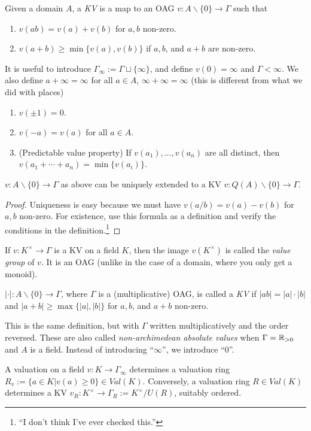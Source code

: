  \begin{definition}
   Given a domain $A$, a \emph{KV} is a map to an OAG $v:A\smallsetminus \{0\}\to \Gamma$
   such that
   \begin{enumerate}
     \item $v(ab)=v(a)+v(b)$ for $a,b$ non-zero.
     \item $v(a+b)\ge \min\{v(a), v(b)\}$ if $a,b$, and $a+b$ are non-zero.
   \end{enumerate}
 \end{definition}
 It is useful to introduce $\Gamma_\infty := \Gamma \sqcup \{\infty\}$, and define
 $v(0)=\infty$ and $\Gamma< \infty$. We also define $a+\infty = \infty$ for all $a\in A$,
 $\infty+\infty=\infty$ (this is different from what we did with places)

 \begin{proposition}
   \begin{enumerate}
     \item $v(\pm 1)=0$.
     \item $v(-a)=v(a)$ for all $a\in A$.
     \item (Predictable value property) If $v(a_1), \dots, v(a_n)$ are all distinct, then
     $v(a_1+\cdots +a_n)=\min \{v(a_i)\}$.
   \end{enumerate}
 \end{proposition}
 \begin{proposition}
   $v:A\smallsetminus \{0\} \to \Gamma$ as above can be uniquely extended to a KV
   $v:Q(A)\smallsetminus \{0\} \to \Gamma$.
 \end{proposition}
 \begin{proof}
   Uniqueness is easy because we must have $v(a/b)=v(a)-v(b)$ for $a,b$ non-zero. For
   existence, use this formula as a definition and verify the conditions in the
   definition.\footnote{``I don't think I've ever checked this.''}
 \end{proof}
 \begin{definition}
   If $v:K^\times \to \Gamma$ is a KV on a field $K$, then the image $v(K^\times)$ is called
   the \emph{value group} of $v$. It is an OAG (unlike in the case of a domain, where you
   only get a monoid).
 \end{definition}
 \begin{definition}
   $|\cdot|:A\smallsetminus \{0\}\to \Gamma$, where $\Gamma$ is a (multiplicative) OAG,
   is called a \emph{KV} if $|ab|=|a|\cdot |b|$ and $|a+b|\ge \max \{|a|,|b|\}$ for
   $a,b$, and $a+b$ non-zero.
 \end{definition}
 This is the same definition, but with $\Gamma$ written multiplicatively and the order
 reversed. These are also called \emph{non-archimedean absolute values} when $\Gamma =
 \mathbb{R}_{> 0}$ and $A$ is a field. Instead of introducing ``$\infty$'', we introduce
 ``$0$''.

 \begin{theorem}
   A valuation on a field $v:K\to \Gamma_\infty$ determines a valuation ring $R_v:=
   \{a\in K|v(a)\ge 0\}\in Val(K)$. Conversely, a valuation ring $R\in Val(K)$ determines
   a KV $v_R:K^\times \to \Gamma_R:=K^\times /U(R)$, suitably ordered.
 \end{theorem}
